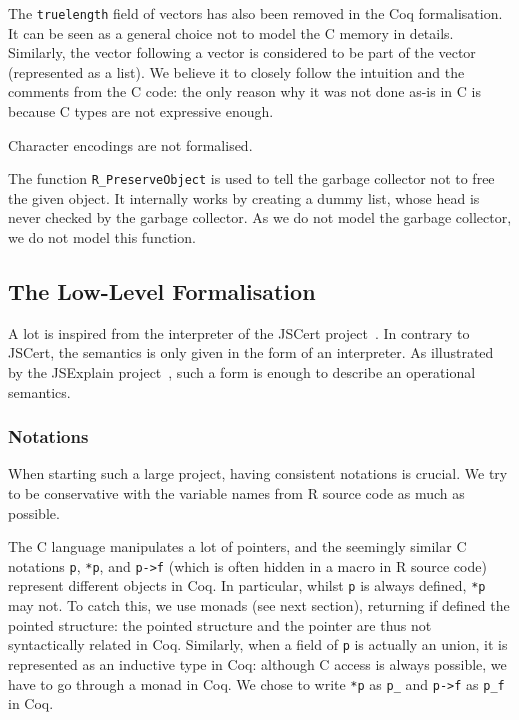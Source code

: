 \documentclass{article}
\newcommand\Coq{Coq}
\newcommand\R{R}
\newcommand\Cn{C}
\begin{document}
The \texttt{truelength} field of vectors has also been
removed in the \Coq{} formalisation.
It can be seen as a general choice not to model the \Cn{} memory in details.
Similarly, the vector following a vector is considered to be part
of the vector (represented as a list).
We believe it to closely follow the intuition and the comments from the \Cn{} code:
the only reason why it was not done as-is in \Cn{} is because \Cn{} types
are not expressive enough.

Character encodings are not formalised.

The function \texttt{R_PreserveObject} is used to tell the garbage collector
not to free the given object.
It internally works by creating a dummy list,
whose head is never checked by the garbage collector.
As we do not model the garbage collector,
we do not model this function.


\subsection{The Low-Level Formalisation}

A lot is inspired from the interpreter of the JSCert project~\parencite{bodin2014trusted}.
In contrary to JSCert, the semantics is only given in the form
of an interpreter.
As illustrated by the JSExplain project~\parencite{JSExplain},
such a form is enough to describe an operational semantics.

\subsubsection{Notations}

When starting such a large project,
having consistent notations is crucial.
We try to be conservative with the variable names from
\R{} source code as much as possible.

The \Cn{} language manipulates a lot of pointers,
and the seemingly similar \Cn{} notations \texttt{p},
\texttt{*p}, and \texttt{p->f}
(which is often hidden in a macro in \R{} source code)
represent different objects in \Coq{}.
In particular, whilst \texttt{p} is always defined,
\texttt{*p} may not.
To catch this, we use monads (see next section),
returning if defined the pointed structure:
the pointed structure and the pointer are thus not
syntactically related in \Coq{}.
Similarly, when a field of \texttt{p} is actually an union,
it is represented as an inductive type in \Coq{}:
although \Cn{} access is always possible,
we have to go through a monad in \Coq{}.
We chose to write \texttt{*p} as \texttt{p_}
and \texttt{p->f} as \texttt{p_f} in \Coq{}.
\end{document}
